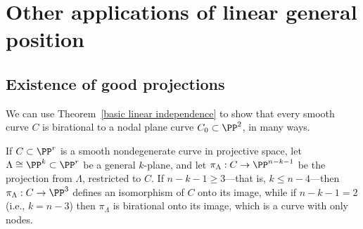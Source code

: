 \section{Other applications of linear general position}

\subsection{Existence of good projections}\label{projection section}\label{good projections}

We can use Theorem~\ref{basic linear independence} to show that every smooth curve $C$ is birational to a nodal plane curve $C_0 \subset \PP^2$, in many ways.

\begin{proposition}\label{nodal projection}
If $C \subset \PP^r$ is a smooth nondegenerate curve in projective space, let $\Lambda \cong \PP^{k} \subset \PP^r$ be a general $k$-plane, and let
$\pi_\Lambda : C \to \PP^{n-k-1}$ be the projection from $\Lambda$, restricted to $C$. If  $n-k-1 \geq 3$---that is, $k \leq n-4$---then
$\pi_\Lambda: C \to \PP^3$ defines an isomorphism of $C$ onto its image, while if $n-k-1 = 2$ (i.e., $k = n- 3$) then $\pi_\Lambda$ is birational onto its image, which is a curve with only nodes.
\end{proposition}

